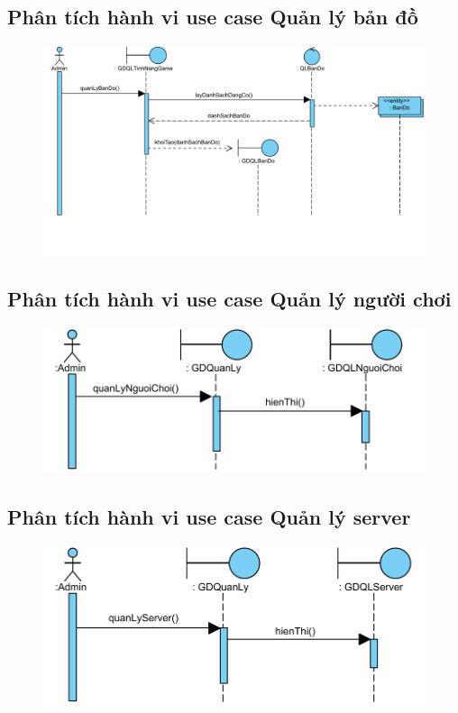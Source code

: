 \documentclass[3p]{elsarticle}
\begin{document}
\subsection{Phân tích hành vi use case Quản lý bản đồ}
\begin{figure}[!htbp]
	\hspace*{-.5in}
	\centering
	\includegraphics[scale=.55]{images/sequence-pdfs/admin/manageMap.pdf}
\end{figure}
\newpage

\subsection{Phân tích hành vi use case Quản lý người chơi}
\begin{figure}[!htbp]
	\hspace*{-.5in}
	\centering
	\includegraphics[scale=.55]{images/sequence-pdfs/admin/managePlayer.pdf}
\end{figure}
\newpage

\subsection{Phân tích hành vi use case Quản lý server}
\begin{figure}[!htbp]
	\hspace*{-.5in}
	\centering
	\includegraphics[scale=.55]{images/sequence-pdfs/admin/manageServer.pdf}
\end{figure}
\newpage
\end{document}
